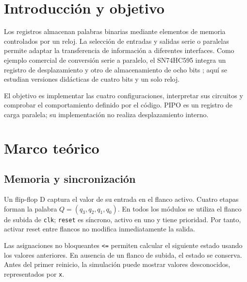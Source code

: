 \documentclass{replab}
\begin{document}
\section{Introducción y objetivo}
Los registros almacenan palabras binarias mediante elementos de memoria controlados por un reloj. La selección de entradas y salidas serie o paralelas permite adaptar la transferencia de información a diferentes interfaces. Como ejemplo comercial de conversión serie a paralelo, el SN74HC595 integra un registro de desplazamiento y otro de almacenamiento de ocho bits \cite{ti}; aquí se estudian versiones didácticas de cuatro bits y un solo reloj.

El objetivo es implementar las cuatro configuraciones, interpretar sus circuitos y comprobar el comportamiento definido por el código. PIPO es un registro de carga paralela; su implementación no realiza desplazamiento interno.

\section{Marco teórico}
\subsection{Memoria y sincronización}
Un flip-flop D captura el valor de su entrada en el flanco activo. Cuatro etapas forman la palabra $Q=(q_3,q_2,q_1,q_0)$. En todos los módulos se utiliza el flanco de subida de \texttt{clk}; \texttt{reset} es síncrono, activo en uno y tiene prioridad. Por tanto, activar reset entre flancos no modifica inmediatamente la salida.

Las asignaciones no bloqueantes \texttt{<=} permiten calcular el siguiente estado usando los valores anteriores. En ausencia de un flanco de subida, el estado se conserva. Antes del primer reinicio, la simulación puede mostrar valores desconocidos, representados por \texttt{x}.
\end{document}
